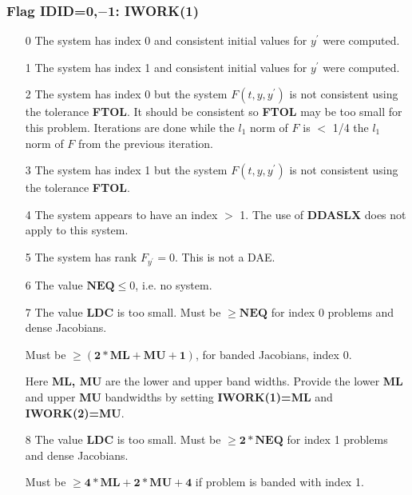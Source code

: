 \documentclass[twoside]{MATH77}
\begin{document}
\begin{description}
\subsubsection{Flag IDID=0,$\mathbf{-1}$: \textbf{IWORK(1)} \label{EXCS}}
\begin{enumerate}
\item[0] The system has index 0 and consistent initial values for $y^{\prime}$
       were computed.
\item[1] The system has index 1 and consistent initial values for $y^{\prime}$
       were computed.
\item[2] The system has index 0 but the system $F(t,y,y^{\prime})$ is
       not consistent using the tolerance \textbf{FTOL}. It should
       be consistent so \textbf{FTOL} may be too small for this problem.
       Iterations are done while the $l_1$ norm of $F$ is $<$
       1/4 the $l_1$ norm of $F$ from the previous iteration.
\item[3] The system has index 1 but the system $F(t,y,y^{\prime})$ is
       not consistent using the tolerance \textbf{FTOL}.
\item[4] The system appears to have an index $>$ 1.  The use of 
      \textbf{DDASLX} does not apply to this system.
\item[5] The system has rank $F_{y^{\prime}} = 0$.  This is not a DAE.
\item[6] The value $\mathbf{NEQ} \leq 0$, i.e. no system.
\item[7] The value \textbf{LDC} is too small.  Must be $\geq \mathbf{NEQ}$
 for index 0 problems and dense Jacobians.

        Must be $\geq \mathbf{(2*ML+MU+1)}$, for banded Jacobians, index 0.

       Here \textbf{ML, MU} are the lower and upper band widths.
       Provide the lower \textbf{ML} and upper \textbf{MU} bandwidths by setting \textbf{IWORK(1)=ML} and
       \textbf{IWORK(2)=MU}.

       
\item[8] The value \textbf{LDC} is too small.  Must be $\geq \mathbf{2*NEQ}$
 for index 1 problems and dense Jacobians.

Must be $\geq \mathbf{4*ML+2*MU+4}$ if problem is banded with index 1.


\end{enumerate}
\end{description}
\end{document}

